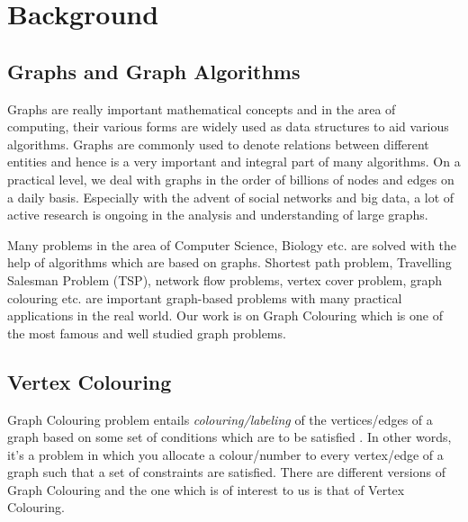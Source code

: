 \documentclass[MTech]{iitmdiss}
\begin{document}
\chapter{Background}
\section{Graphs and Graph Algorithms}
Graphs are really important mathematical concepts and in the area of computing, their various forms are widely used as data structures to aid various algorithms. Graphs are commonly used to denote relations between different entities and hence is a very important and integral part of many algorithms. On a practical level, we deal with graphs in the order of billions of nodes and edges on a daily basis. Especially with the advent of social networks and big data, a lot of active research is ongoing in the analysis and understanding of large graphs.

Many problems in the area of Computer Science, Biology etc. are solved with the help of algorithms which are based on graphs. Shortest path problem, Travelling Salesman Problem (TSP), network flow problems, vertex cover problem, graph colouring etc. are important graph-based problems with many practical applications in the real world. Our work is on Graph Colouring which is one of the most famous and well studied graph problems.
\section{Vertex Colouring}
Graph Colouring problem entails \textit{colouring/labeling} of the vertices/edges of a graph based on some set of conditions which are to be satisfied \citep{jensen2011graph}. In other words, it's a problem in which you allocate a colour/number to every vertex/edge of a graph such that a set of constraints are satisfied. There are different versions of Graph Colouring and the one which is of interest to us is that of Vertex Colouring.
\end{document}
